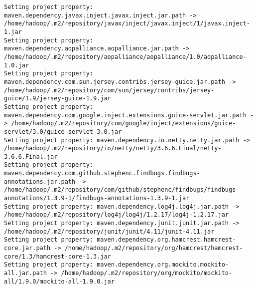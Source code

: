 \begin{verbatim}
Setting project property: maven.dependency.javax.inject.javax.inject.jar.path -> /home/hadoop/.m2/repository/javax/inject/javax.inject/1/javax.inject-1.jar
Setting project property: maven.dependency.aopalliance.aopalliance.jar.path -> /home/hadoop/.m2/repository/aopalliance/aopalliance/1.0/aopalliance-1.0.jar
Setting project property: maven.dependency.com.sun.jersey.contribs.jersey-guice.jar.path -> /home/hadoop/.m2/repository/com/sun/jersey/contribs/jersey-guice/1.9/jersey-guice-1.9.jar
Setting project property: maven.dependency.com.google.inject.extensions.guice-servlet.jar.path -> /home/hadoop/.m2/repository/com/google/inject/extensions/guice-servlet/3.0/guice-servlet-3.0.jar
Setting project property: maven.dependency.io.netty.netty.jar.path -> /home/hadoop/.m2/repository/io/netty/netty/3.6.6.Final/netty-3.6.6.Final.jar
Setting project property: maven.dependency.com.github.stephenc.findbugs.findbugs-annotations.jar.path -> /home/hadoop/.m2/repository/com/github/stephenc/findbugs/findbugs-annotations/1.3.9-1/findbugs-annotations-1.3.9-1.jar
Setting project property: maven.dependency.log4j.log4j.jar.path -> /home/hadoop/.m2/repository/log4j/log4j/1.2.17/log4j-1.2.17.jar
Setting project property: maven.dependency.junit.junit.jar.path -> /home/hadoop/.m2/repository/junit/junit/4.11/junit-4.11.jar
Setting project property: maven.dependency.org.hamcrest.hamcrest-core.jar.path -> /home/hadoop/.m2/repository/org/hamcrest/hamcrest-core/1.3/hamcrest-core-1.3.jar
Setting project property: maven.dependency.org.mockito.mockito-all.jar.path -> /home/hadoop/.m2/repository/org/mockito/mockito-all/1.9.0/mockito-all-1.9.0.jar
\end{verbatim}



